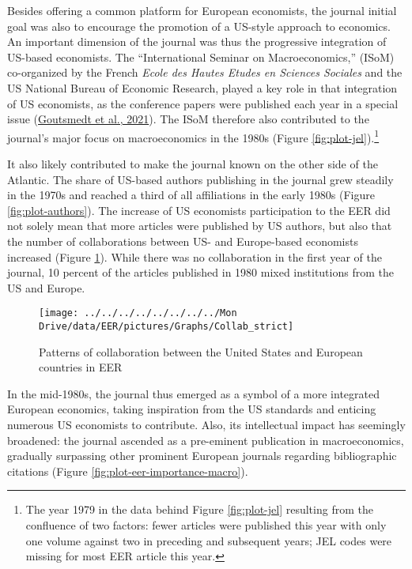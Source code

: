 \documentclass[
  12pt,
  onecolumn]{article}
\begin{document}
Besides offering a common platform for European economists, the journal
initial goal was also to encourage the promotion of a US-style approach
to economics. An important dimension of the journal was thus the
progressive integration of US-based economists. The ``International
Seminar on Macroeconomics,'' (ISoM) co-organized by the French
\emph{Ecole des Hautes Etudes en Sciences Sociales} and the US National
Bureau of Economic Research, played a key role in that integration of US
economists, as the conference papers were published each year in a
special issue (\protect\hyperlink{ref-goutsmedt2021}{Goutsmedt et al.,
2021}). The ISoM therefore also contributed to the journal's major focus
on macroeconomics in the 1980s (Figure \ref{fig:plot-jel}).\footnote{The
  year 1979 in the data behind Figure \ref{fig:plot-jel} resulting from
  the confluence of two factors: fewer articles were published this year
  with only one volume against two in preceding and subsequent years;
  JEL codes were missing for most EER article this year.}

It also likely contributed to make the journal known on the other side
of the Atlantic. The share of US-based authors publishing in the journal
grew steadily in the 1970s and reached a third of all affiliations in
the early 1980s (Figure \ref{fig:plot-authors}). The increase of US
economists participation to the EER did not solely mean that more
articles were published by US authors, but also that the number of
collaborations between US- and Europe-based economists increased (Figure
\ref{fig:plot-collabs}). While there was no collaboration in the first
year of the journal, 10 percent of the articles published in 1980 mixed
institutions from the US and Europe.

\begin{figure}[h]

{\centering \texttt{[image: ../../../../../../../../Mon Drive/data/EER/pictures/Graphs/Collab\_strict]} 

}

\caption{Patterns of collaboration between the United States and European countries in EER}\label{fig:plot-collabs}
\end{figure}

In the mid-1980s, the journal thus emerged as a symbol of a more
integrated European economics, taking inspiration from the US standards
and enticing numerous US economists to contribute. Also, its
intellectual impact has seemingly broadened: the journal ascended as a
pre-eminent publication in macroeconomics, gradually surpassing other
prominent European journals regarding bibliographic citations (Figure
\ref{fig:plot-eer-importance-macro}).
\end{document}
